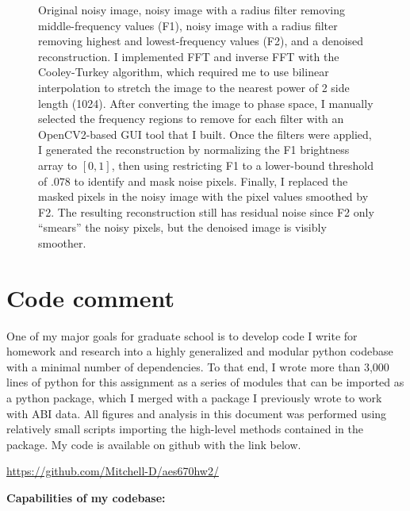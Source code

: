 \documentclass[12pt]{article}
\begin{document}
\begin{figure}[h!]
    \caption{Original noisy image, noisy image with a radius filter removing middle-frequency values (F1), noisy image with a radius filter removing highest and lowest-frequency values (F2), and a denoised reconstruction. I implemented FFT and inverse FFT with the Cooley-Turkey algorithm, which required me to use bilinear interpolation to stretch the image to the nearest power of 2 side length (1024). After converting the image to phase space, I manually selected the frequency regions to remove for each filter with an OpenCV2-based GUI tool that I built. Once the filters were applied, I generated the reconstruction by normalizing the F1 brightness array to $[0,1]$, then using restricting F1 to a lower-bound threshold of $.078$ to identify and mask noise pixels. Finally, I replaced the masked pixels in the noisy image with the pixel values smoothed by F2. The resulting reconstruction still has residual noise since F2 only ``smears'' the noisy pixels, but the denoised image is visibly smoother.}
    \label{p11_fc}
\end{figure}

\clearpage

\section{Code comment}

One of my major goals for graduate school is to develop code I write for homework and research into a highly generalized and modular python codebase with a minimal number of dependencies. To that end, I wrote more than 3,000 lines of python for this assignment as a series of modules that can be imported as a python package, which I merged with a package I previously wrote to work with ABI data. All figures and analysis in this document was performed using relatively small scripts importing the high-level methods contained in the package. My code is available on github with the link below.

\vspace{1em}

\begin{center}
    \url{https://github.com/Mitchell-D/aes670hw2/}
\end{center}

\vspace{1em}

\noindent
\textbf{Capabilities of my codebase:}
\end{document}
